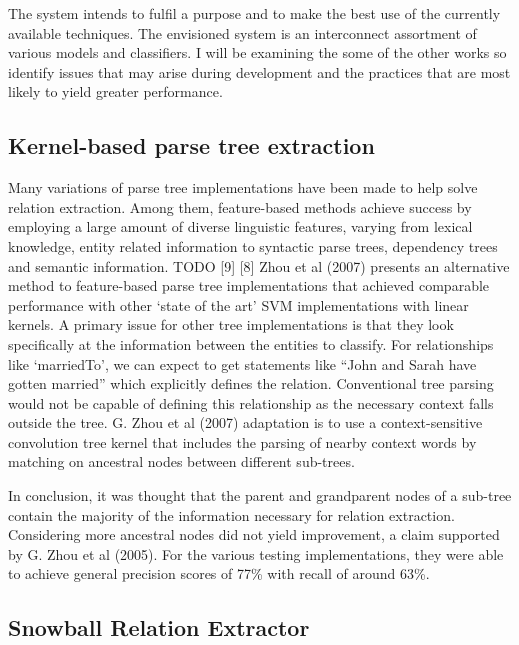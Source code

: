 \documentclass[11pt]{article} %
\begin{document}
The system intends to fulfil a purpose and to make the best use of the currently available techniques. The envisioned system is an interconnect assortment of various models and classifiers. I will be examining the some of the other works so identify issues that may arise during development and the practices that are most likely to yield greater performance.

\subsection{Kernel-based parse tree extraction}
Many variations of parse tree implementations have been made to help solve relation extraction. Among them, feature-based methods achieve success by employing a large amount of diverse linguistic features, varying from lexical knowledge, entity related information to syntactic parse trees, dependency trees and semantic information. TODO [9] [8] Zhou et al (2007) presents an alternative method to feature-based parse tree implementations that achieved comparable performance with other ‘state of the art’ SVM implementations with linear kernels. A primary issue for other tree implementations is that they look specifically at the information between the entities to classify. For relationships like ‘marriedTo’, we can expect to get statements like “John and Sarah have gotten married” which explicitly defines the relation. Conventional tree parsing would not be capable of defining this relationship as the necessary context falls outside the tree. G. Zhou et al (2007) adaptation is to use a context-sensitive convolution tree kernel that includes the parsing of nearby context words by matching on ancestral nodes between different sub-trees.

In conclusion, it was thought that the parent and grandparent nodes of a sub-tree contain the majority of the information necessary for relation extraction. Considering more ancestral nodes did not yield improvement, a claim supported by G. Zhou et al (2005). For the various testing implementations, they were able to achieve general precision scores of 77\% with recall of around 63\%.

\subsection{Snowball Relation Extractor}
\end{document}
